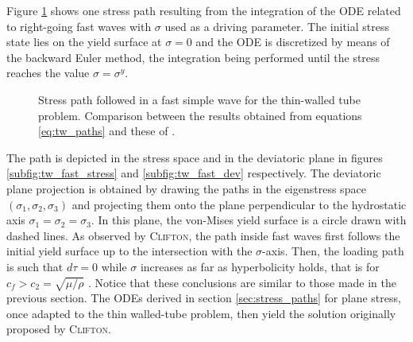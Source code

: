 Figure \ref{fig:fast_clifton} shows one stress path resulting from the integration of the ODE related to right-going fast waves with $\sigma$ used as a driving parameter.
The initial stress state lies on the yield surface at $\sigma=0$ and the ODE is discretized by means of the backward Euler method, the integration being performed until the stress reaches the value $\sigma=\sigma^y $.
\begin{figure}[h!]
  \centering
   \qquad
  \caption{Stress path followed in a fast simple wave for the thin-walled tube problem. Comparison between the results obtained from equations \eqref{eq:tw_paths} and these of \cite{Clifton}.}
  \label{fig:fast_clifton}
\end{figure}
The path is depicted in the stress space and in the deviatoric plane in figures \ref{subfig:tw_fast_stress} and \ref{subfig:tw_fast_dev} respectively.
The deviatoric plane projection is obtained by drawing the paths in the eigenstress space $(\sigma_1,\sigma_2,\sigma_3)$ and projecting them onto the plane perpendicular to the hydrostatic axis $\sigma_1=\sigma_2=\sigma_3$.
In this plane, the von-Mises yield surface is a circle drawn with dashed lines.
As observed by \textsc{Clifton}, the path inside fast waves first follows the initial yield surface up to the intersection with the $\sigma$-axis.
Then, the loading path is such that $d\tau=0$ while $\sigma$ increases as far as hyperbolicity holds, that is for $c_f > c_2 = \sqrt{\mu/\rho} $ \cite{Clifton}.
Notice that these conclusions are similar to those made in the previous section.
The ODEs derived in section \ref{sec:stress_paths} for plane stress, once adapted to the thin walled-tube problem, then yield the solution originally proposed by \textsc{Clifton}.

